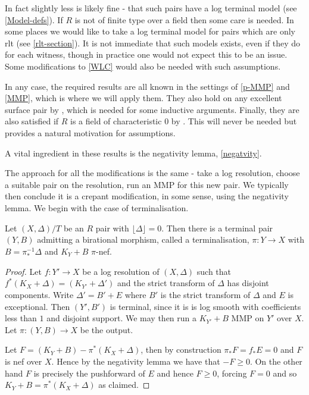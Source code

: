 In fact slightly less is likely fine - that such pairs have a log terminal model (see \autoref{Model-defs}). If $R$ is not of finite type over a field then some care is needed. In some places we would like to take a log terminal model for pairs which are only rlt (see \autoref{rlt-section}). It is not immediate that such models exists, even if they do for each witness, though in practice one would not expect this to be an issue. Some modifications to \autoref{WLC} would also be needed with such assumptions.

In any case, the required results are all known in the settings of \autoref{p-MMP} and \autoref{MMP}, which is where we will apply them. They also hold on any excellent surface pair by \cite{tanaka2018minimal}, which is needed for some inductive arguments. Finally, they are also satisfied if $R$ is a field of characteristic $0$ by \cite{BCHM10}. This will never be needed but provides a natural motivation for assumptions.

A vital ingredient in these results is the negativity lemma, \autoref{negatvity}.

The approach for all the modifications is the same - take a log resolution, choose a suitable pair on the resolution, run an MMP for this new pair. We typically then conclude it is a crepant modification, in some sense, using the negativity lemma. We begin with the case of terminalisation.


\begin{lemma}
	
	Let $(X,\Delta)/T$ be an $R$ pair with $\lfloor \Delta \rfloor =0$. Then there is a terminal pair $(Y,B)$ admitting a birational morphism, called a terminalisation, $\pi\colon Y \to X$ with $B=\pi_{*}^{-1}\Delta$ and $K_{Y}+B$ $\pi$-nef.
	
	\end{lemma}



\begin{proof}
	
	Let $f\colon Y' \to X$ be a log resolution of $(X,\Delta)$ such that $f^{*}(K_{X}+\Delta)=(K_{Y'}+\Delta')$ and the strict transform of $\Delta$ has disjoint components. Write $\Delta'=B'+E$ where $B'$ is the strict transform of $\Delta$ and $E$ is exceptional. Then $(Y',B')$ is terminal, since it is is log smooth with coefficients less than $1$ and disjoint support. We may then run a $K_{Y'}+B$ MMP on $Y'$ over $X$. Let $\pi:(Y,B) \to X$ be the output. 
	
	Let $F=(K_{Y}+B)-\pi^{*}(K_{X}+\Delta)$, then by construction $\pi_{*}F=f_{*}E=0$ and $F$ is nef over $X$. Hence by the negativity lemma we have that $-F \geq 0$. On the other hand $F$ is precisely the pushforward of $E$ and hence $F \geq 0$, forcing $F=0$ and so $K_{Y}+B=\pi^{*}(K_{X}+\Delta)$ as claimed.

\end{proof}

